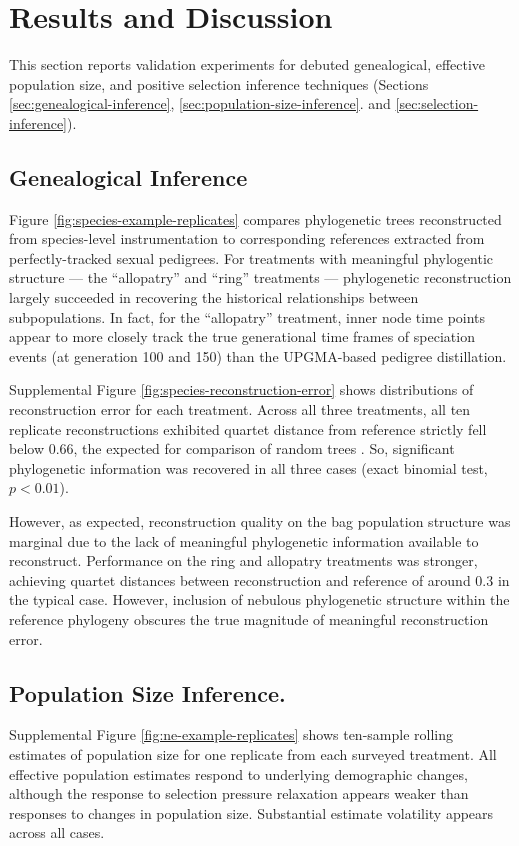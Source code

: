 \section{Results and Discussion} \label{sec:results}

This section reports validation experiments for debuted genealogical, effective population size, and positive selection inference techniques (Sections \ref{sec:genealogical-inference}, \ref{sec:population-size-inference}. and \ref{sec:selection-inference}).

\subsection{Genealogical Inference}


Figure \ref{fig:species-example-replicates} compares phylogenetic trees reconstructed from species-level instrumentation to corresponding references extracted from perfectly-tracked sexual pedigrees.
For treatments with meaningful phylogentic structure --- the ``allopatry'' and ``ring'' treatments --- phylogenetic reconstruction largely succeeded in recovering the historical relationships between subpopulations.
In fact, for the ``allopatry'' treatment, inner node time points appear to more closely track the true generational time frames of speciation events (at generation 100 and 150) than the UPGMA-based pedigree distillation.

Supplemental Figure \ref{fig:species-reconstruction-error} shows distributions of reconstruction error for each treatment.
Across all three treatments, all ten replicate reconstructions exhibited quartet distance from reference strictly fell below 0.66, the expected for comparison of random trees \citep{smith2020information}.
So, significant phylogenetic information was recovered in all three cases (exact binomial test, $p < 0.01$).

However, as expected, reconstruction quality on the bag population structure was marginal due to the lack of meaningful phylogenetic information available to reconstruct.
Performance on the ring and allopatry treatments was stronger, achieving quartet distances between reconstruction and reference of around 0.3 in the typical case.
However, inclusion of nebulous phylogenetic structure within the reference phylogeny obscures the true magnitude of meaningful reconstruction error.

\subsection{Population Size Inference.}
Supplemental Figure \ref{fig:ne-example-replicates} shows ten-sample rolling estimates of population size for one replicate from each surveyed treatment.
All effective population estimates respond to underlying demographic changes, although the response to selection pressure relaxation appears weaker than responses to changes in population size.
Substantial estimate volatility appears across all cases.

